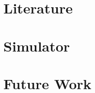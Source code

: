 \documentclass[a4paper,12pt]{article}
\begin{document}


\section{Literature} \label{s:lit}

\section{Simulator} \label{s:sim}

\section{Future Work} \label{s:concl}
\end{document}
